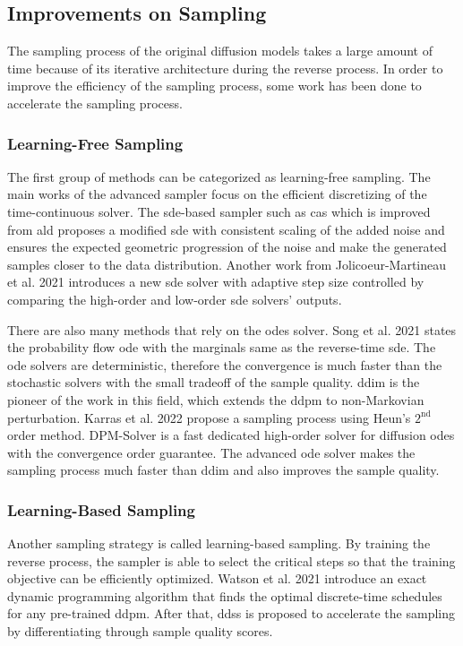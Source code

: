 \documentclass[12pt,DIV14,BCOR12mm,a4paper,footinclude=false,headinclude,parskip=half-,twoside,openright,cleardoublepage=empty,toc=index,bibliography=totoc,listof=totoc]{scrreprt}
\numberwithin{equation}{chapter}
\begin{document}
\subsection{Improvements on Sampling}\label{sec:impr_sample}

The sampling process of the original diffusion models takes a large amount of time because of its iterative architecture during the reverse process. In order to improve the efficiency of the sampling process, some work has been done to accelerate the sampling process.
\subsubsection{Learning-Free Sampling}
The first group of methods can be categorized as learning-free sampling. The main works of the advanced sampler focus on the efficient discretizing of the time-continuous solver. The \gls{sde}-based sampler such as \gls{cas} \cite{jolicoeurmartineau2020adversarial} which is improved from \gls{ald} \cite{dockhorn2022scorebased} proposes a modified \gls{sde} with consistent scaling of the added noise and ensures the expected geometric progression of the noise and make the generated samples closer to the data distribution. Another work from Jolicoeur-Martineau et al. 2021 \cite{jolicoeurmartineau2021gotta} introduces a new \gls{sde} solver with adaptive step size controlled by comparing the high-order and low-order \gls{sde} solvers' outputs.

There are also many methods that rely on the \glspl{ode} solver. Song et al. 2021 \cite{song2021scorebased} states the probability flow \gls{ode} with the marginals same as the reverse-time \gls{sde}. The \gls{ode} solvers are deterministic, therefore the convergence is much faster than the stochastic solvers with the small tradeoff of the sample quality. \gls{ddim} \cite{song2022denoising} is the pioneer of the work in this field, which extends the \gls{ddpm} to non-Markovian perturbation. Karras et al. 2022 \cite{karras2022elucidating} propose a sampling process using Heun's $2^{\text{nd}}$ order method. DPM-Solver \cite{lu2022dpmsolver} is a fast dedicated high-order solver for diffusion \glspl{ode} with the convergence order guarantee. The advanced \gls{ode} solver makes the sampling process much faster than \gls{ddim} and also improves the sample quality.

\subsubsection{Learning-Based Sampling}
Another sampling strategy is called learning-based sampling. By training the reverse process, the sampler is able to select the critical steps so that the training objective can be efficiently optimized. Watson et al. 2021 \cite{watson2021learning} introduce an exact dynamic programming algorithm that finds the optimal discrete-time schedules for any pre-trained \gls{ddpm}. After that, \gls{ddss} \cite{watson2022learning} is proposed to accelerate the sampling by differentiating through sample quality scores. 
\end{document}
